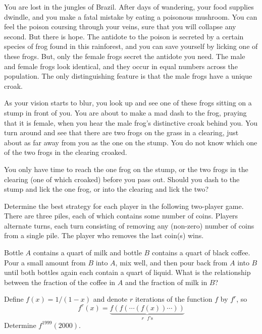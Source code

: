 \documentclass[12pt]{article}
\begin{document}
    \begin{exercise}
        You are lost in the jungles of Brazil. After days of wandering, your food supplies dwindle, and you make a fatal mistake by eating a poisonous mushroom. You can feel the poison coursing through your veins, sure that you will collapse any second. But there is hope. The antidote to the poison is secreted by a certain species of frog found in this rainforest, and you can save yourself by licking one of these frogs. But, only the female frogs secret the antidote you need. The male and female frogs look identical, and they occur in equal numbers across the population. The only distinguishing feature is that the male frogs have a unique croak.

        As your vision starts to blur, you look up and see one of these frogs sitting on a stump in front of you. You are about to make a mad dash to the frog, praying that it is female, when you hear the male frog's distinctive croak behind you. You turn around and see that there are two frogs on the grass in a clearing, just about as far away from you as the one on the stump. You do not know which one of the two frogs in the clearing croaked.

        You only have time to reach the one frog on the stump, or the two frogs in the clearing (one of which croaked) before you pass out. Should you dash to the stump and lick the one frog, or into the clearing and lick the two?
    \end{exercise}
    
    \begin{exercise}
        Determine the best strategy for each player in the following two-player game. There are three piles, each of which contains some number of coins. Players alternate turns, each turn consisting of removing any (non-zero) number of coins from a single pile. The player who removes the last coin(s) wins.
    \end{exercise}

    \begin{exercise}
        Bottle $A$ contains a quart of milk and bottle $B$ contains a quart of black coffee. Pour a small amount from $B$ into $A$, mix well, and then pour back from $A$ into $B$ until both bottles again each contain a quart of liquid. What is the relationship between the fraction of the coffee in $A$ and the fraction of milk in $B$?
    \end{exercise}
        
    \begin{exercise}
        Define $f(x)=1/(1-x)$ and denote $r$ iterations of the function $f$ by $f^r$, so \[f^r(x)=\underbrace{f(f(\cdots(f(x))\cdots))}_{r\text{ $f$'s}} \] Determine $f^{1999}(2000)$.
    \end{exercise}
        
\end{document}
